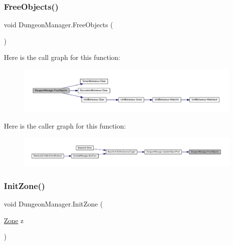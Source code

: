 \subsubsection{\texorpdfstring{FreeObjects()}{FreeObjects()}}
{\footnotesize\ttfamily void Dungeon\+Manager.\+Free\+Objects (\begin{DoxyParamCaption}{ }\end{DoxyParamCaption})}

Here is the call graph for this function\+:\nopagebreak
\begin{figure}[H]
\begin{center}
\leavevmode
\includegraphics[width=350pt]{class_dungeon_manager_ab7edf3b19e13892178a34ece10f4c5d5_cgraph}
\end{center}
\end{figure}
Here is the caller graph for this function\+:\nopagebreak
\begin{figure}[H]
\begin{center}
\leavevmode
\includegraphics[width=350pt]{class_dungeon_manager_ab7edf3b19e13892178a34ece10f4c5d5_icgraph}
\end{center}
\end{figure}
\mbox{\label{class_dungeon_manager_afc7ff9dc122b876f72a4f238496f3a26}} 
\subsubsection{\texorpdfstring{InitZone()}{InitZone()}}
{\footnotesize\ttfamily void Dungeon\+Manager.\+Init\+Zone (\begin{DoxyParamCaption}\item[{\mbox{\hyperlink{class_dungeon_manager_a6558d4a01889674bf25c798f1b90a431}{Zone}}}]{z }\end{DoxyParamCaption})}

